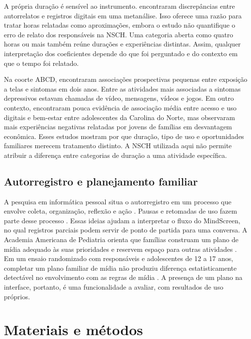 ﻿\documentclass[12pt]{article}
\begin{document}
A própria duração é sensível ao instrumento. \cite{parry2021} encontraram discrepâncias entre autorrelatos e registros digitais em uma metanálise. Isso oferece uma razão para tratar horas relatadas como aproximações, embora o estudo não quantifique o erro de relato dos responsáveis na NSCH. Uma categoria aberta como quatro horas ou mais também reúne durações e experiências distintas. Assim, qualquer interpretação dos coeficientes depende do que foi perguntado e do contexto em que o tempo foi relatado.

Na coorte ABCD, \cite{nagata2024} encontraram associações prospectivas pequenas entre exposição a telas e sintomas em dois anos. Entre as atividades mais associadas a sintomas depressivos estavam chamadas de vídeo, mensagens, vídeos e jogos. Em outro contexto, \cite{george2020} encontraram pouca evidência de associação média entre acesso e uso digitais e bem-estar entre adolescentes da Carolina do Norte, mas observaram mais experiências negativas relatadas por jovens de famílias em desvantagem econômica. Esses estudos mostram por que duração, tipo de uso e oportunidades familiares merecem tratamento distinto. A NSCH utilizada aqui não permite atribuir a diferença entre categorias de duração a uma atividade específica.

\subsection{Autorregistro e planejamento familiar}
A pesquisa em informática pessoal situa o autorregistro em um processo que envolve coleta, organização, reflexão e ação \cite{li2010informatica}. Pausas e retomadas de uso fazem parte desse processo \cite{epstein2015}. Essas ideias ajudam a interpretar o fluxo do MindScreen, no qual registros parciais podem servir de ponto de partida para uma conversa. A Academia Americana de Pediatria orienta que famílias construam um plano de mídia adequado às suas prioridades e reservem espaço para outras atividades \cite{aap2026}. Em um ensaio randomizado com responsáveis e adolescentes de 12 a 17 anos, completar um plano familiar de mídia não produziu diferença estatisticamente detectável no envolvimento com as regras de mídia \cite{moreno2021}. A presença de um plano na interface, portanto, é uma funcionalidade a avaliar, com resultados de uso próprios.

\section{Materiais e métodos}
\end{document}
